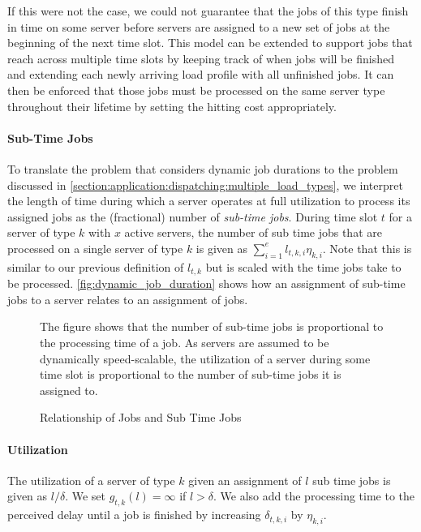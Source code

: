 If this were not the case, we could not guarantee that the jobs of this type finish in time on some server before servers are assigned to a new set of jobs at the beginning of the next time slot. This model can be extended to support jobs that reach across multiple time slots by keeping track of when jobs will be finished and extending each newly arriving load profile with all unfinished jobs. It can then be enforced that those jobs must be processed on the same server type throughout their lifetime by setting the hitting cost appropriately.

\paragraph{Sub-Time Jobs} To translate the problem that considers dynamic job durations to the problem discussed in \autoref{section:application:dispatching:multiple_load_types}, we interpret the length of time during which a server operates at full utilization to process its assigned jobs as the (fractional) number of \emph{sub-time jobs}. During time slot $t$ for a server of type $k$ with $x$ active servers, the number of sub time jobs that are processed on a single server of type $k$ is given as $\sum_{i=1}^e l_{t,k,i} \eta_{k,i}$. Note that this is similar to our previous definition of $l_{t,k}$ but is scaled with the time jobs take to be processed. \autoref{fig:dynamic_job_duration} shows how an assignment of sub-time jobs to a server relates to an assignment of jobs.

\begin{figure}
    \centering
    [TODO]

    The figure shows that the number of sub-time jobs is proportional to the processing time of a job. As servers are assumed to be dynamically speed-scalable, the utilization of a server during some time slot is proportional to the number of sub-time jobs it is assigned to.
    \caption{Relationship of Jobs and Sub Time Jobs}
    \label{fig:dynamic_job_duration}
\end{figure}

\paragraph{Utilization} The utilization of a server of type $k$ given an assignment of $l$ sub time jobs is given as $l / \delta$. We set $g_{t,k}(l) = \infty$ if $l > \delta$. We also add the processing time to the perceived delay until a job is finished by increasing $\delta_{t,k,i}$ by $\eta_{k,i}$.

